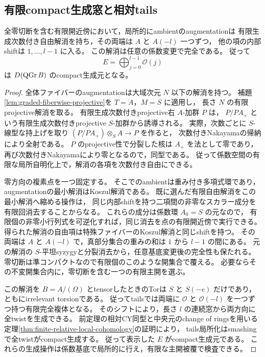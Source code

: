 \subsection{有限compact生成窓と相対tails}

\begin{lemma}\label{lem:simultaneous-finite-window}
全零切断を含む有限開近傍において，局所的にambientのaugmentationは
有限生成次数付き自由解消を持ち，その両端は $A$ と $A(-l)$ 一つずつ，
他の項の内部shiftは $1,\ldots,l-1$ に入る。
この解消は任意の係数変更で完全である。
従って
\[
 E=\bigoplus_{j=0}^{l-1}\mathcal O(j)
\]
は $D(\operatorname{QGr} B)$ のcompact生成元となる。
\end{lemma}
\begin{proof}
全体ファイバーのaugmentationは大域次元 $N$ 以下の解消を持つ。
補題\ref{lem:graded-fiberwise-projective}を $T=A$，$M=S$ に適用し，
長さ $N$ の有限projective解消を取る。
有限生成次数付きprojective右 $A$-加群 $P$ は，
$P/PA_+$ という有限生成次数付きprojective $S$-加群から誘導される。
実際，次数ごとに $S$-線型な持上げを取り $(P/PA_+)\otimes_S A\to P$ を作ると，
次数付きNakayamaの帰納により全射である。
$P$ のprojective性で分裂した核は $A_+$ を法として零であり，
再び次数付きNakayamaにより零となるので，同型である。
従って係数空間の有限な局所自明化上で，解消の各項を次数付き自由にできる。

零方向の複素点を一つ固定する。
そこでのambientは重み付き多項式環であり，augmentationの最小解消はKoszul解消である。
既に選んだ有限自由解消をこの最小解消へ縮める操作は，
同じ内部shiftを持つ二項間の非零なスカラー成分を有限回消去することからなる。
これらの成分は係数環 $A_0=S$ の元なので，
有限個の非零小行列式を可逆化すれば，同じ消去を点の有限開近傍で実行できる。
得られた解消の自由項は特殊ファイバーのKoszul解消と同じshiftを持つ。
その両端は $A$ と $A(-l)$ で，真部分集合の重みの和は $1$ から $l-1$ の間にある。
元の解消の $S$-平坦syzygyと分裂消去から，任意基底変更後の完全性も保たれる。
零切断は準コンパクトなので有限個のこのような開集合で覆える。
必要ならその不変開集合内に，零切断を含む一つの有限主開を選ぶ。

この解消を $B=A/(\Omega)$ とtensorしたときのTorは
$S$ と $S(-e)$ だけであり，ともにirrelevant torsionである。
従ってtailsでは両端に $\mathcal O$ と $\mathcal O(-l)$ を一つずつ持つ有限完全複体となる。
そのシフトにより，長さ $l$ の連続窓から両方向に全twistを生成できる。
前定理の相対CY同型と中央元のchange of ringsを用いる
定理\ref{thm:finite-relative-local-cohomology}の証明により，
tails局所化はsmashingで全twistがcompact生成する。
従って表示した $E$ がcompact生成元である。
これらの生成操作は係数基底で局所的に行え，有限な主開被覆で検査できる。
\end{proof}


